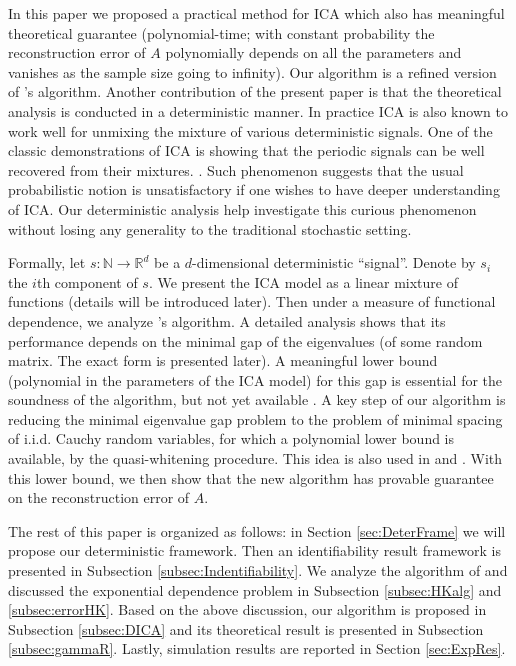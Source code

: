 \documentclass[twoside]{article}
\newcommand{\ra}{\rightarrow}
\newcommand{\real}{\mathbb{R}}
\renewcommand{\natural}{\mathbb{N}}
\theoremstyle{definition}
\begin{document}
In this paper we proposed a practical method for ICA which also has meaningful theoretical guarantee (polynomial-time; with constant probability the reconstruction error of $A$ polynomially depends on all the parameters and vanishes as the sample size going to infinity).
Our algorithm is a refined version of \cite{hsu2013learning}'s algorithm.  
Another contribution of the present paper is that the theoretical analysis is conducted in a deterministic manner. 
In practice ICA is also known to work well for unmixing the mixture of various deterministic signals. 
One of the classic demonstrations of ICA is showing that the periodic signals can be well recovered from their mixtures. \citep{HyvOja00}.
Such phenomenon suggests that the usual probabilistic notion is unsatisfactory if one wishes to have deeper understanding of ICA.   
Our deterministic analysis help investigate this curious phenomenon without losing any generality to the traditional stochastic setting. 

Formally, let $s:\natural \ra \real^d$ be a $d$-dimensional deterministic ``signal''. 
Denote by $s_i$ the $i$th component of $s$.
We present the ICA model as a linear mixture of functions (details will be introduced later).
Then under a measure of functional dependence, we analyze  \citep{hsu2013learning}'s algorithm.
A detailed analysis shows that its performance depends on the minimal gap of the eigenvalues (of some random matrix. The exact form is presented later).
A meaningful lower bound  (polynomial in the parameters of the ICA model) for this gap is essential for the soundness of the algorithm, but not yet available \citep{cardoso1999high}.
A key step of our algorithm is reducing the minimal eigenvalue gap problem to the problem of minimal spacing of i.i.d. Cauchy random variables, for which a polynomial lower bound is available, by the quasi-whitening procedure.
This idea is also used in \citep{frieze1996learning} and \citep{arora2012provable}.
With this lower bound, we then show that the new algorithm has provable guarantee on the reconstruction error of $A$. 

The rest of this paper is organized as follows: 
in Section \ref{sec:DeterFrame} we will propose our deterministic framework. 
Then an identifiability result framework is presented in Subsection \ref{subsec:Indentifiability}.
We analyze the algorithm of \cite{hsu2013learning} and discussed the exponential dependence problem in Subsection \ref{subsec:HKalg} and \ref{subsec:errorHK}. 
Based on the above discussion, our algorithm is proposed in Subsection \ref{subsec:DICA} and its theoretical result is presented in Subsection \ref{subsec:gammaR}.
Lastly, simulation results are reported in Section \ref{sec:ExpRes}.
\end{document}
